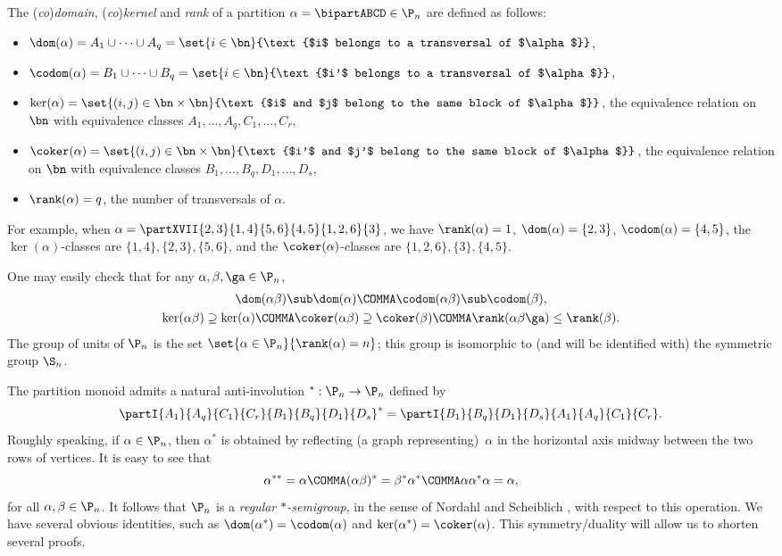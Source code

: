 The (\emph{co})\emph{domain}, (\emph{co})\emph{kernel} and \emph{rank} of a partition $\alpha=\bipartABCD\in\P_n$ are defined as follows:~
\begin{itemize}
\item
$\dom(\alpha) =A_1\cup\dots\cup A_q= \set{i\in\bn}{\text{$i$ belongs to a transversal of $\alpha$}}$,
\item
$\codom(\alpha) =B_1\cup\dots\cup B_q =\set{i\in\bn}{\text{$i'$ belongs to a transversal of $\alpha$}}$,
\item
$\ker(\alpha) = \set{(i,j)\in\bn\times\bn}{\text{$i$ and $j$ belong to the same block of $\alpha$}}$,
the equivalence relation on $\bn$ with equivalence classes $A_1,\dots, A_q,C_1, \dots, C_r$,
\item
$\coker(\alpha) = \set{(i,j)\in\bn\times\bn}{\text{$i'$ and $j'$ belong to the same block of $\alpha$}}$,
the equivalence relation on $\bn$ with equivalence classes $B_1,\dots, B_q,D_1, \dots, D_s$,
\item
$\rank(\alpha)=q$, the number of transversals of $\alpha$.
\end{itemize}
For example, when $\alpha = \partXVII{2,3}{1,4}{5,6}{4,5}{1,2,6}{3}$, we have
$\rank(\alpha)=1$, $\dom(\alpha)=\{2,3\}$, $\codom(\alpha)=\{4,5\}$, the $\ker(\alpha)$-classes are $\{1,4\},\{2,3\},\{5,6\}$, and the $\coker(\alpha)$-classes are $\{1,2,6\},\{3\},\{4,5\}$.


One may easily check that for any $\alpha,\beta,\ga\in\P_n$,
\begin{gather*}
\dom(\alpha\beta)\sub\dom(\alpha) \COMMA \codom(\alpha\beta)\sub\codom(\beta) , \\
\ker(\alpha\beta)\supseteq\ker(\alpha) \COMMA \coker(\alpha\beta)\supseteq\coker(\beta) \COMMA
\rank(\alpha\beta\ga)\leq\rank(\beta).
\end{gather*}
The group of units of $\P_n$ is the set $\set{\alpha\in\P_n}{\rank(\alpha)=n}$; this
group is isomorphic to (and will be identified with) the symmetric group $\S_n$.

The partition monoid
admits a natural anti-involution ${}^*:\P_n\to\P_n$ defined by
\[
\partI{A_1}{A_q}{C_1}{C_r}{B_1}{B_q}{D_1}{D_s}^*=\partI{B_1}{B_q}{D_1}{D_s}{A_1}{A_q}{C_1}{C_r}.
\]
Roughly speaking, if $\alpha\in\P_n$, then $\alpha^*$ is obtained by reflecting (a graph representing)~$\alpha$ in the horizontal axis midway between the two rows of vertices.  It is easy to see that
\[
\alpha^{**}=\alpha \COMMA (\alpha\beta)^*=\beta^*\alpha^* \COMMA \alpha\alpha^*\alpha=\alpha,
\]
for all $\alpha,\beta\in\P_n$.  It follows that $\P_n$ is a \emph{regular $*$-semigroup}, in the sense of Nordahl and Scheiblich \cite{NS1978}, with respect to this operation.
We have several obvious identities, such as $\dom(\alpha^*)=\codom(\alpha)$ and $\ker(\alpha^*)=\coker(\alpha)$.
This symmetry/duality will allow us to shorten several proofs.


